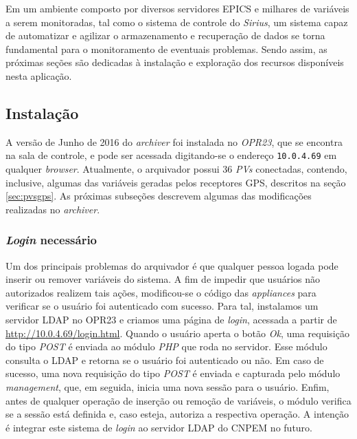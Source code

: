 \vspace{12pt}


Em um ambiente composto por diversos servidores EPICS e milhares de variáveis a
serem monitoradas, tal como o sistema de controle do \textit{Sirius}, um sistema
capaz de automatizar e agilizar o armazenamento e recuperação de dados se torna
fundamental para o monitoramento de eventuais problemas. Sendo assim, as próximas seções são
dedicadas à instalação e exploração dos recursos disponíveis nesta aplicação.

\subsection {Instalação}

A versão de Junho de 2016 do \textit{archiver} foi instalada no \textit{OPR23},
que se encontra na sala de controle, e pode ser acessada digitando-se o endereço
\texttt{10.0.4.69} em qualquer \textit{browser}. Atualmente, o arquivador possui
36 \textit{PVs} conectadas, contendo, inclusive, algumas das variáveis geradas
pelos receptores GPS, descritos na seção \ref{sec:pvsgps}. As próximas
subseções descrevem algumas das modificações realizadas no \textit{archiver}.

\subsubsection{\textit{Login} necessário}

Um dos principais problemas do arquivador é que qualquer pessoa logada
pode inserir ou remover variáveis do sistema. A fim de impedir que usuários não
autorizados realizem tais ações, modificou-se o código das
\textit{appliances} para verificar se o usuário foi autenticado com sucesso.
Para tal, instalamos um servidor LDAP no OPR23 e criamos uma página
de \textit{login}, acessada a partir de \url{http://10.0.4.69/login.html}. Quando o
usuário aperta o botão \textit{Ok}, uma requisição do tipo \textit{POST} é
enviada ao módulo \textit{PHP} que roda no servidor. Esse módulo consulta o LDAP
e retorna se o usuário foi autenticado ou não. Em caso de sucesso, uma nova
requisição do tipo \textit{POST} é enviada e capturada pelo módulo
\textit{management}, que, em seguida, inicia uma nova sessão para o usuário.
Enfim, antes de qualquer operação de inserção ou remoção de variáveis, o
módulo verifica se a sessão está definida e, caso esteja, autoriza a respectiva
operação. A intenção é integrar este sistema de \textit{login} ao servidor
LDAP do CNPEM no futuro.

